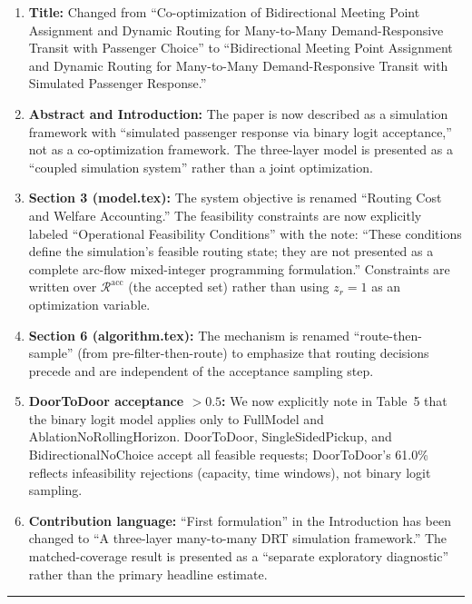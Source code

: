 \documentclass[12pt]{article}
\begin{document}
\begin{enumerate}
  \item \textbf{Title:} Changed from ``Co-optimization of Bidirectional Meeting Point Assignment and Dynamic Routing for Many-to-Many Demand-Responsive Transit with Passenger Choice'' to ``Bidirectional Meeting Point Assignment and Dynamic Routing for Many-to-Many Demand-Responsive Transit with Simulated Passenger Response.''

  \item \textbf{Abstract and Introduction:} The paper is now described as a simulation framework with ``simulated passenger response via binary logit acceptance,'' not as a co-optimization framework. The three-layer model is presented as a ``coupled simulation system'' rather than a joint optimization.

  \item \textbf{Section 3 (model.tex):} The system objective is renamed ``Routing Cost and Welfare Accounting.'' The feasibility constraints are now explicitly labeled ``Operational Feasibility Conditions'' with the note: ``These conditions define the simulation's feasible routing state; they are not presented as a complete arc-flow mixed-integer programming formulation.'' Constraints are written over $\mathcal{R}^{\text{acc}}$ (the accepted set) rather than using $z_r=1$ as an optimization variable.

  \item \textbf{Section 6 (algorithm.tex):} The mechanism is renamed ``route-then-sample'' (from pre-filter-then-route) to emphasize that routing decisions precede and are independent of the acceptance sampling step.

  \item \textbf{DoorToDoor acceptance $>0.5$:} We now explicitly note in Table~5 that the binary logit model applies only to FullModel and AblationNoRollingHorizon. DoorToDoor, SingleSidedPickup, and BidirectionalNoChoice accept all feasible requests; DoorToDoor's 61.0\% reflects infeasibility rejections (capacity, time windows), not binary logit sampling.

  \item \textbf{Contribution language:} ``First formulation'' in the Introduction has been changed to ``A three-layer many-to-many DRT simulation framework.'' The matched-coverage result is presented as a ``separate exploratory diagnostic'' rather than the primary headline estimate.
\end{enumerate}

\bigskip\hrule\bigskip
\end{document}

